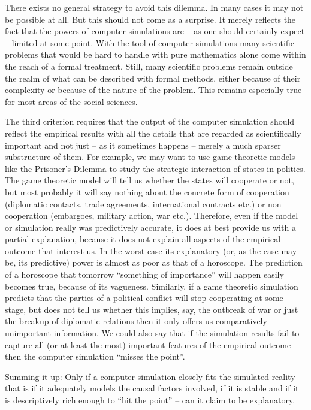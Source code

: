 There exists no general strategy to avoid this dilemma. In many cases
it may not be possible at all. But this should not come as a surprise.
It merely reflects the fact that the powers of computer simulations
are -- as one should certainly expect -- limited at some point. With
the tool of computer simulations many scientific problems that would
be hard to handle with pure mathematics alone come within the reach of
a formal treatment. Still, many scientific problems remain outside the
realm of what can be described with formal methods, either because of
their complexity or because of the nature of the problem. This remains
especially true for most areas of the social sciences.

The third criterion requires that the output of the computer simulation
should reflect the empirical results with all the details that are
regarded as scientifically important and not just -- as it sometimes
happens -- merely a much sparser substructure of them. For example, we
may want to use game theoretic models like the Prisoner's Dilemma to
study the strategic interaction of states in politics. The game
theoretic model will tell us whether the states will cooperate or not,
but most probably it will say nothing about the concrete form of
cooperation (diplomatic contacts, trade agreements, international
contracts etc.) or non cooperation (embargoes, military action, war
etc.). Therefore, even if the model or simulation really was
predictively accurate, it does at best provide us with a partial
explanation, because it does not explain all aspects of the empirical
outcome that interest us. In the worst case its explanatory (or, as
the case may be, its predictive) power is almost as poor as that of
a horoscope. The prediction of a horoscope that tomorrow
``something of importance'' will happen easily becomes true, because of
its vagueness.  Similarly, if a game theoretic simulation predicts
that the parties of a political conflict will stop cooperating at some
stage, but does not tell us whether this implies, say, the outbreak of
war or just the breakup of diplomatic relations then it only offers us
comparatively unimportant information. We could also say that if the
simulation results fail to capture all (or at least the most)
important features of the empirical outcome then the computer
simulation ``misses the point''.

Summing it up: Only if a computer simulation closely fits the simulated
reality -- that is if it adequately models the causal factors involved, if it
is stable and if it is descriptively rich enough to ``hit the point'' --
can it claim to be explanatory. 

